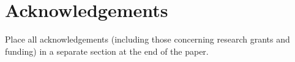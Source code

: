 \documentclass[10pt, a4paper]{article}
\begin{document}



%
%
%
%
%

\section{Acknowledgements}

Place all acknowledgements (including those concerning research grants and funding) in a separate section at the end of the paper.
\end{document}
